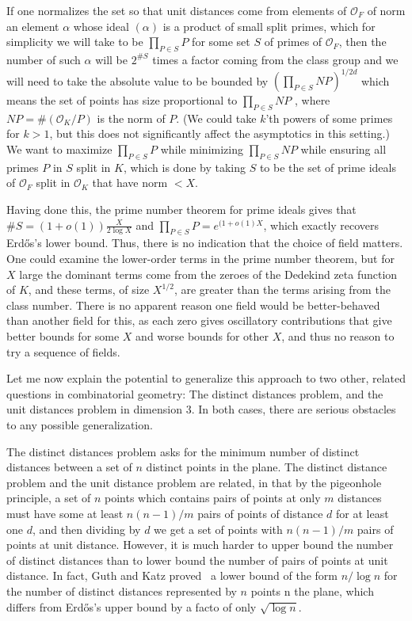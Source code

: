 \documentclass[11pt,reqno]{amsart}
\numberwithin{equation}{section}
\theoremstyle{definition}
\theoremstyle{remark}
\begin{document}
 If one normalizes the set so that unit distances come from elements of $\mathcal O_F$ of norm an element $\alpha$ whose ideal $(\alpha)$ is a product of small split primes, which for simplicity we will take to be $\prod_{P \in S} P$ for some set $S$ of primes of $\mathcal O_F$, then the number of such $\alpha$ will be $2^{ \#S}$ times a factor coming from the class group and we will need to take the absolute value to be bounded by $\left(\prod_{P \in S} NP\right)^{1/{2d}}$ which means the set of points has size proportional to $\prod_{P \in S} NP$ , where $NP = \# (\mathcal O_K/P)$ is the norm of $P$. (We could take $k$'th powers of some primes for $k>1$, but this does not significantly affect the asymptotics in this setting.) We want to maximize $\prod_{P \in S} P$ while minimizing $\prod_{P \in S} NP$  while ensuring all primes $P$ in $S$ split in $K$, which is done by taking $S$ to be the set of prime ideals of $\mathcal O_F$ split in $\mathcal O_K$ that have norm $<X$. 

Having done this, the prime number theorem for prime ideals gives that $\# S = (1+o(1)) \frac{X }{2\log X} $ and $\prod_{P \in S} P= e^{ (1+o(1) X}$, which exactly recovers Erd\H{o}s's lower bound. Thus, there is no indication that the choice of field matters. One could examine the lower-order terms in the prime number theorem, but for $X$ large the dominant terms come from the zeroes of the Dedekind zeta function of $K$, and these terms, of size $X^{1/2}$, are greater than the terms arising from the class number. There is no apparent reason one field would be better-behaved than another field for this, as each zero gives oscillatory contributions that give better bounds for some $X$  and worse bounds for other $X$, and thus no reason to try a sequence of fields.

Let me now explain the potential to generalize this approach to two other, related questions in combinatorial geometry: The distinct distances problem, and the unit distances problem in dimension $3$. In both cases, there are serious obstacles to any possible generalization.

The distinct distances problem asks for the minimum number of distinct distances between a set of $n$ distinct points in the plane. The distinct distance problem and the unit distance problem are related, in that by the pigeonhole principle, a set of $n$ points which contains pairs of points at only $m$ distances must have some at least $n(n-1)/m$ pairs of points of distance $d$ for at least one $d$, and then dividing by $d$ we get a set of points with $n(n-1)/m$ pairs of points at unit distance. However, it is much harder to upper bound the number of distinct distances than to lower bound the number of pairs of points at unit distance. In fact, Guth and Katz proved~\cite{GuthKatz2015DistinctDistances} a lower bound of the form $n/\log n$ for the number of distinct distances represented by $n$ points n the plane, which differs from Erd\H{o}s's upper bound by a facto of only $\sqrt{\log n}$.
\end{document}
